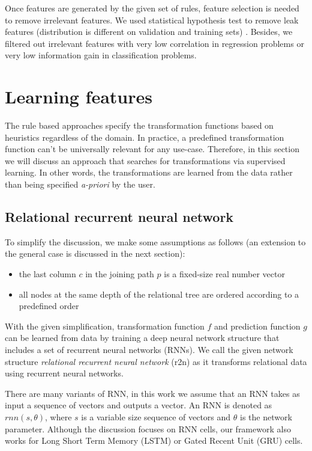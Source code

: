 Once features are generated by the given set of rules, feature selection is needed to remove irrelevant features. We used statistical hypothesis test to remove leak features (distribution is different on validation and training sets) \cite{onebm}. Besides, we filtered out irrelevant features with very low correlation in regression problems or very low information gain in classification problems.


\section{Learning features}
The rule based approaches specify the transformation functions based on heuristics regardless of the domain. In practice, a predefined transformation function can't be universally relevant for any use-case. Therefore, in this section we will discuss an approach that searches for transformations via supervised learning. In other words, the transformations are learned from the data rather than being specified \textit{a-priori} by the user.
\subsection{Relational recurrent neural network}
\label{sec:r2n}
To simplify the discussion, we make some assumptions as follows (an extension to the general case is discussed in the next section):
\begin{itemize}
\item the last column $c$ in the joining path $p$ is a fixed-size real number vector 
\item all nodes at the same depth of the relational tree are ordered according to a predefined order
\end{itemize}

With the given simplification, transformation function $f$ and prediction function $g$ can be learned from data by training a deep neural network structure that includes a set of recurrent neural networks (RNNs). We call the given network structure \textit{relational recurrent neural network} (r2n) as it transforms relational data using recurrent neural networks.

There are many variants of RNN, in this work we assume that an RNN takes as input a sequence of vectors and outputs a vector. An RNN is denoted as $rnn(s, \theta)$, where $s$ is a variable size sequence of vectors and $\theta$ is the network parameter. Although the discussion focuses on RNN cells, our framework also works for Long Short Term Memory (LSTM) or Gated Recent Unit (GRU) cells.


